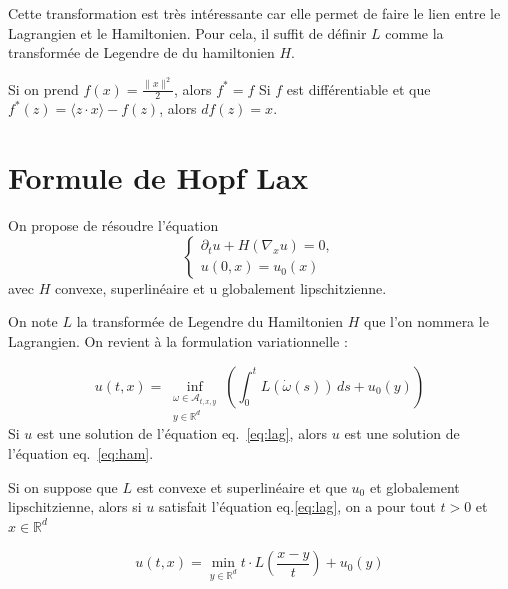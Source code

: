 \documentclass[10pt]{article}
\newcommand{\R}{\mathbb{R}}
\begin{document}
\rem Cette transformation est très intéressante car elle permet de faire le lien entre le Lagrangien et le Hamiltonien.
Pour cela, il suffit de définir $L$ comme la transformée de Legendre de du hamiltonien $H$.

\ex Si on prend  $f(x) = \frac{\|x\|^2}{2}$, alors $f^* = f$
\ex Si $f$ est différentiable et que $f^*(z) = \langle z \cdot x \rangle - f(z)$, alors
$df(z) = x$.

\section{Formule de Hopf Lax}

On propose de résoudre l'équation
\begin{equation}
	\begin{cases}
		\partial_t u + H(\nabla_x u) = 0, \\
		u(0,x) = u_0(x)
	\end{cases}
	\label{eq:ham}
\end{equation}
avec $H$ convexe, superlinéaire et u globalement lipschitzienne.

\medskip

On note $L$ la transformée de Legendre du Hamiltonien $H$ que l'on nommera le Lagrangien. On revient à la formulation variationnelle :

\begin{equation}
	u(t,x) = \inf_{\substack{\omega \in \mathcal{A}_{t,x,y} \\
			y \in \mathbb{R}^d}}
	\left(
	\int_{0}^t L(\dot{\omega}(s))\, ds + u_0(y)
	\right)
	\label{eq:lag}
\end{equation}
Si $u$ est une solution de l'équation eq.~\ref{eq:lag}, alors $u$ est une solution de l'équation eq.~\ref{eq:ham}.

 Si on suppose que $L$ est convexe et superlinéaire et que $u_0$ et globalement lipschitzienne, alors si $u$ satisfait l'équation eq.\ref{eq:lag}, on a pour tout $t > 0$ et $x \in \R^d$

\begin{equation}
	u(t,x) = \min_{y \in \R^d} t\cdot L\left(\frac{x-y}{t}\right) + u_0(y)
	\label{eq:hopf}
\end{equation}
\end{document}
